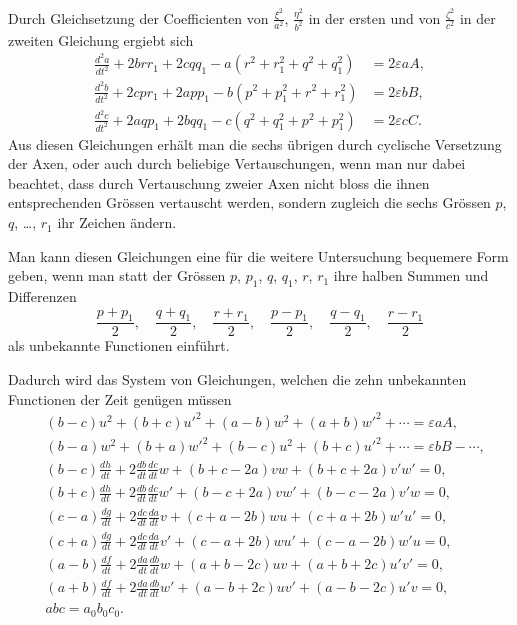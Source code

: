 \documentclass[12pt,a4paper]{article}
\begin{document}
Durch Gleichsetzung der Coefficienten von $\frac{\xi^{2}}{a^{2}}$, $\frac{\eta^{2}}{b^{2}}$ in der ersten und von $\frac{\zeta^{2}}{c^{2}}$ in der zweiten Gleichung ergiebt sich
\begin{align*}
\frac{d^{2}a}{dt^{2}} + 2brr_{1} + 2cqq_{1} - a(r^{2} + r_{1}^{2} + q^{2} + q_{1}^{2}) &= 2\varepsilon aA,\\
\frac{d^{2}b}{dt^{2}} + 2cpr_{1} + 2app_{1} - b(p^{2} + p_{1}^{2} + r^{2} + r_{1}^{2}) &= 2\varepsilon bB,\\
\frac{d^{2}c}{dt^{2}} + 2aqp_{1} + 2bqq_{1} - c(q^{2} + q_{1}^{2} + p^{2} + p_{1}^{2}) &= 2\varepsilon cC.\tag{a}
\end{align*}
Aus diesen Gleichungen erh\"alt man die sechs \"ubrigen durch cyclische Versetzung der Axen, oder auch durch beliebige Vertauschungen, wenn man nur dabei beachtet, dass durch Vertauschung zweier Axen nicht bloss die ihnen entsprechenden Gr\"ossen vertauscht werden, sondern zugleich die sechs Gr\"ossen $p$, $q$, \dots, $r_{1}$ ihr Zeichen \"andern.

Man kann diesen Gleichungen eine f\"ur die weitere Untersuchung bequemere Form geben, wenn man statt der Gr\"ossen $p$, $p_{1}$, $q$, $q_{1}$, $r$, $r_{1}$ ihre halben Summen und Differenzen
\[
\frac{p + p_{1}}{2},\quad \frac{q + q_{1}}{2},\quad \frac{r + r_{1}}{2},\quad \frac{p - p_{1}}{2},\quad \frac{q - q_{1}}{2},\quad \frac{r - r_{1}}{2}
\]
als unbekannte Functionen einf\"uhrt.

Dadurch wird das System von Gleichungen, welchen die zehn unbekannten Functionen der Zeit gen\"ugen m\"ussen
\begin{align*}
&(b - c)u^{2} + (b + c)u'^{2} + (a - b)w^{2} + (a + b)w'^{2} + \cdots = \varepsilon aA,\\
&(b - a)w^{2} + (b + a)w'^{2} + (b - c)u^{2} + (b + c)u'^{2} + \cdots = \varepsilon bB - \cdots,\\
&(b - c)\frac{dh}{dt} + 2\frac{db}{dt}\frac{dc}{dt}w + (b + c - 2a)vw + (b + c + 2a)v'w' = 0,\\
&(b + c)\frac{dh}{dt} + 2\frac{db}{dt}\frac{dc}{dt}w' + (b - c + 2a)vw' + (b - c - 2a)v'w = 0,\\
&(c - a)\frac{dg}{dt} + 2\frac{dc}{dt}\frac{da}{dt}v + (c + a - 2b)wu + (c + a + 2b)w'u' = 0,\\
&(c + a)\frac{dg}{dt} + 2\frac{dc}{dt}\frac{da}{dt}v' + (c - a + 2b)wu' + (c - a - 2b)w'u = 0,\\
&(a - b)\frac{df}{dt} + 2\frac{da}{dt}\frac{db}{dt}w + (a + b - 2c)uv + (a + b + 2c)u'v' = 0,\\
&(a + b)\frac{df}{dt} + 2\frac{da}{dt}\frac{db}{dt}w' + (a - b + 2c)uv' + (a - b - 2c)u'v = 0,\\
&abc = a_{0}b_{0}c_{0}.
\end{align*}
\end{document}
